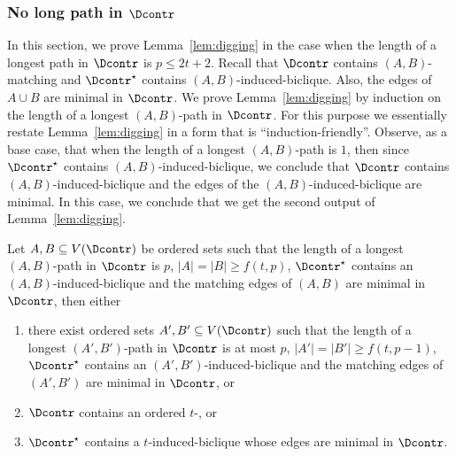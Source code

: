 
\subsubsection{No long path in $\Dcontr$}\label{sec:biclique:nolongpath}

In this section, we prove Lemma~\ref{lem:digging} in the case when the length of a longest path in $\Dcontr$ is $p \leq 2t+2$. Recall that $\Dcontr$ contains $(A,B)$-matching and $\Dcontr^{\star}$ contains $(A,B)$-induced-biclique. Also, the edges of $A \cup B$ are minimal in $\Dcontr$. We prove Lemma~\ref{lem:digging} by induction on the length of a longest $(A,B)$-path in $\Dcontr$.
For this purpose we essentially restate Lemma~\ref{lem:digging} in a form that is ``induction-friendly''. Observe, as a base case, that when the length of a longest $(A,B)$-path is $1$, then since $\Dcontr^{\star}$ contains $(A,B)$-induced-biclique, we conclude that $\Dcontr$ contains $(A,B)$-induced-biclique and the edges of the $(A,B)$-induced-biclique are minimal. In this case, we conclude that we get the second output of Lemma~\ref{lem:digging}.

\begin{lemma}\label{lem:biclique:nolongpath}
Let $A,B \subseteq V(\Dcontr)$ be ordered sets such that the length
of a longest $(A,B)$-path in $\Dcontr$ is $p$,
$|A|= |B| \geq f(t,p)$, $\Dcontr^{\star}$ contains an $(A,B)$-induced-biclique and the matching edges of $(A,B)$ are minimal in $\Dcontr$, then either
\begin{enumerate}
\item there exist ordered sets $A',B' \subseteq V(\Dcontr)$ such that the length
of a longest $(A',B')$-path in $\Dcontr$ is at most $p$,
$|A'|= |B'| \geq f(t,p-1)$, $\Dcontr^{\star}$ contains an $(A',B')$-induced-biclique and the matching edges of $(A',B')$ are minimal in $\Dcontr$, or
\item $\Dcontr$ contains an ordered $t$-\toughpair, or
\item $\Dcontr^{\star}$ contains a $t$-induced-biclique whose edges are minimal in $\Dcontr$.
\end{enumerate}
\end{lemma}

